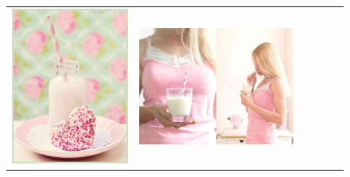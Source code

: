 \begin{figure}
\begin{tabular}{m{.01\linewidth} m{.16\linewidth} m{.16\linewidth} m{.16\linewidth} m{.16\linewidth} m{.16\linewidth}}
    \includegraphics[width=\linewidth]{../style/figures/flickr_on_flickr/pred_style_Pastel/1.jpg} &
    \includegraphics[width=\linewidth]{../style/figures/flickr_on_flickr/pred_style_Pastel/2.jpg} &

\end{tabular}
\end{figure}
